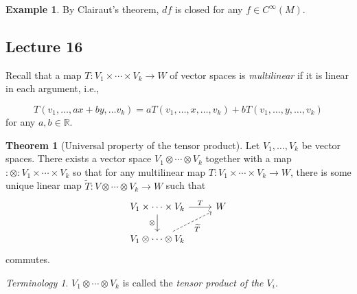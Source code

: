 \documentclass[10pt,letterpaper,cm]{nupset}
\theoremstyle{definition}
\newtheorem{exmp}[definition]{Example}
\theoremstyle{theorem}
\newtheorem{theorem}[definition]{Theorem}
\theoremstyle{remark}
\newtheorem*{term}{Terminology}
\newcommand{\R}{\mathbb R}
\newcommand{\1}{\mathbf{1}}
\newcommand{\0}{\vec 0}
\begin{document}
\begin{exmp}
By Clairaut's theorem, $df$ is closed for any $f\in C^{\infty}(M)$. 
\end{exmp}

\subsection{Lecture 16}

Recall that 
a map $T: V_1 \times \cdots \times V_k \to W$ of vector spaces is \textit{multilinear} if it is linear in each argument, i.e.,

\[
T(v_1, \ldots, ax+by, \ldots v_k) = aT(v_1, \ldots, x, \ldots, v_k) +   bT(v_1, \ldots, y, \ldots, v_k) 
\] for any $a,b\in \R$.



\begin{theorem}[Universal property of the tensor product]
Let $V_1, \ldots, V_k$ be vector spaces. There exists a vector space $V_1 \otimes \cdots \otimes V_k$ together with a map $:\otimes : V_1\times \cdots \times V_k$ so that for any multilinear map $T: V_1 \times \cdots \times V_k \to W$, there is some unique linear map $\widetilde{T} : V \otimes \cdots \otimes V_k \to W$ such that 
\[
\begin{tikzcd}
V_1 \times \cdots \times V_k \arrow[d, "\otimes"'] \arrow[r, "T"] & W \\
V_1 \otimes \cdots \otimes V_k \arrow[ru, "\widetilde{T}"', dashed] & 
\end{tikzcd}
\] commutes.
\end{theorem}

\begin{term}
$V_1 \otimes \cdots \otimes V_k$ is called the \textit{tensor product of the $V_i$}.
\end{term}
\end{document}
